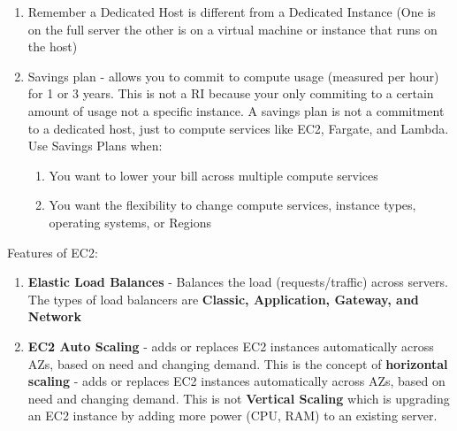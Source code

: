 \documentclass{article}%
\begin{document}
\begin{enumerate}
\begin{enumerate}
    \end{enumerate}
    \item Remember a Dedicated Host is different from a Dedicated Instance (One is on the full server the other is on a virtual machine or instance that runs on the host)
    \item Savings plan - allows you to commit to compute usage (measured per hour) for 1 or 3 years. This is not a RI because your only commiting to a certain amount of usage not a specific instance. A savings plan is not a commitment to a dedicated host, just to compute services like EC2, Fargate, and Lambda. Use Savings Plans when:
    \begin{enumerate}
        \item You want to lower your bill across multiple compute services
        \item You want the flexibility to change compute services, instance types, operating systems, or Regions
    \end{enumerate}
\end{enumerate}
Features of EC2:
\begin{enumerate}
    \item \textbf{Elastic Load Balances} - Balances the load (requests/traffic) across servers. The types of load balancers are \textbf{Classic, Application, Gateway, and Network}
    \item \textbf{EC2 Auto Scaling} - adds or replaces EC2 instances automatically across AZs, based on need and changing demand. This is the concept of \textbf{horizontal scaling} - adds or replaces EC2 instances automatically across AZs, based on need and changing demand. 
    This is not \textbf{Vertical Scaling} which is upgrading an EC2 instance by adding more power (CPU, RAM) to an existing server.
\end{enumerate}
\end{document}
